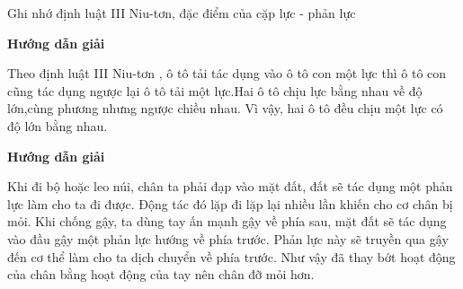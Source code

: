 \begin{dang}{Ghi nhớ định luật III Niu-tơn, đặc điểm của cặp lực - phản lực}
	{	\begin{center}
			\textbf{Hướng dẫn giải}
		\end{center}
		
		Theo định luật III Niu-tơn , ô tô tải tác dụng vào ô tô con một lực thì ô tô con cũng tác dụng ngược lại ô tô tải một lực.Hai ô tô chịu lực bằng nhau về độ lớn,cùng phương nhưng ngược chiều nhau. Vì vậy, hai ô tô đều chịu một lực có độ lớn bằng nhau.
		
	}
	{	\begin{center}
			\textbf{Hướng dẫn giải}
		\end{center}
		
		Khi đi bộ hoặc leo núi, chân ta phải đạp vào mặt đất, đất sẽ tác dụng một phản lực làm cho ta đi được. Động tác đó lặp đi lặp lại nhiều lần khiến cho cơ chân bị mỏi. Khi chống gậy, ta dùng tay ấn mạnh gậy về phía sau, mặt đất sẽ tác dụng vào đầu gậy một phản lực hướng về phía trước. Phản lực này sẽ truyền qua gậy đến cơ thể làm cho ta dịch chuyển về phía trước. Như vậy đã thay bớt hoạt động của chân bằng hoạt động của tay nên chân đỡ mỏi hơn.
	}
\end{dang}

